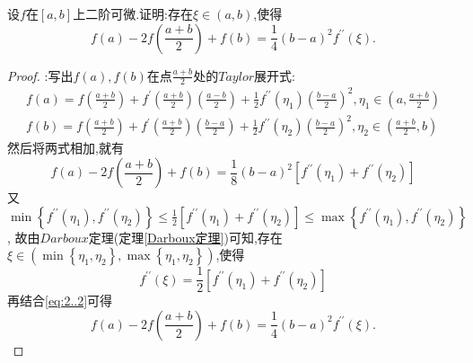 \documentclass[lang=cn,newtx,10pt,scheme=chinese]{../Template/elegantbook}
\begin{document}
\begin{example}
    设\(f\)在\([a,b]\)上二阶可微.证明:存在\(\xi\in(a,b)\),使得
    \begin{equation}
        f(a)-2f\left(\frac{a + b}{2}\right)+f(b)=\frac{1}{4}(b - a)^{2}f^{\prime\prime}(\xi).
        \nonumber
    \end{equation}
    \begin{proof}
        {\color{blue} }:写出$f(a),f(b)$在点$\frac{a+b}{2}$处的$Taylor$展开式:
        \begin{gather}
            f(a)=f\left( \frac{a+b}{2} \right) +f^{\prime}\left( \frac{a+b}{2} \right) \left( \frac{a-b}{2} \right) +\frac{1}{2}f^{\prime\prime}(\eta _1)\left( \frac{b-a}{2} \right) ^2,\eta _1\in \left( a,\frac{a+b}{2} \right) 
            \nonumber\\
f(b)=f\left( \frac{a+b}{2} \right) +f^{\prime}\left( \frac{a+b}{2} \right) \left( \frac{b-a}{2} \right) +\frac{1}{2}f^{\prime\prime}(\eta _2)\left( \frac{b-a}{2} \right) ^2,\eta _2\in \left( \frac{a+b}{2},b \right) 
            \nonumber
        \end{gather}
        然后将两式相加,就有
        \begin{equation}\label{eq:2..2}
            f\left( a \right) -2f\left( \frac{a+b}{2} \right) +f\left( b \right) =\frac{1}{8}\left( b-a \right) ^2\left[ f^{\prime\prime}\left( \eta _1 \right) +f^{\prime\prime}\left( \eta _2 \right) \right]
        \end{equation}
        又$\min \left\{ f^{\prime\prime}\left( \eta _1 \right) ,f^{\prime\prime}\left( \eta _2 \right) \right\} \leqslant \frac{1}{2}\left[ f^{\prime\prime}\left( \eta _1 \right) +f^{\prime\prime}\left( \eta _2 \right) \right] \leqslant \max \left\{ f^{\prime\prime}\left( \eta _1 \right) ,f^{\prime\prime}\left( \eta _2 \right) \right\}$,
        故由$Darboux$定理(定理\ref{Darboux定理})可知,存在$\xi\in\left( \min \left\{ \eta _1,\eta _2 \right\} ,\max \left\{ \eta _1,\eta _2 \right\} \right)$,使得
        \begin{equation}
            f^{\prime\prime}\left( \xi \right) =\frac{1}{2}\left[ f^{\prime\prime}\left( \eta _1 \right) +f^{\prime\prime}\left( \eta _2 \right) \right]
            \nonumber
        \end{equation}
        再结合\eqref{eq:2..2}可得
        \begin{equation}
            f(a)-2f\left(\frac{a + b}{2}\right)+f(b)=\frac{1}{4}(b - a)^{2}f^{\prime\prime}(\xi).
            \nonumber
        \end{equation}


\end{proof}
\end{example}
\end{document}
